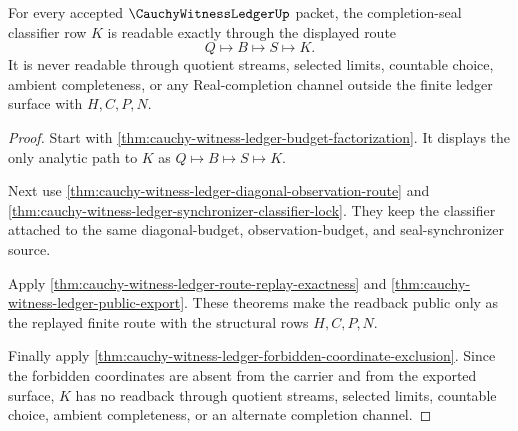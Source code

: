 \begin{theorem}
\label{thm:cauchy-witness-ledger-completion-classifier-readback}
For every accepted $\CauchyWitnessLedgerUp$ packet, the completion-seal
classifier row $K$ is readable exactly through the displayed route
$$
Q \longmapsto B \longmapsto S \longmapsto K.
$$
It is never readable through quotient streams, selected limits, countable
choice, ambient completeness, or any Real-completion channel outside the
finite ledger surface with $H,C,P,N$.
\end{theorem}
\begin{proof}
Start with \autoref{thm:cauchy-witness-ledger-budget-factorization}. It
displays the only analytic path to $K$ as
$Q \longmapsto B \longmapsto S \longmapsto K$.

Next use \autoref{thm:cauchy-witness-ledger-diagonal-observation-route} and
\autoref{thm:cauchy-witness-ledger-synchronizer-classifier-lock}. They keep
the classifier attached to the same diagonal-budget, observation-budget, and
seal-synchronizer source.

Apply \autoref{thm:cauchy-witness-ledger-route-replay-exactness} and
\autoref{thm:cauchy-witness-ledger-public-export}. These theorems make the
readback public only as the replayed finite route with the structural rows
$H,C,P,N$.

Finally apply \autoref{thm:cauchy-witness-ledger-forbidden-coordinate-exclusion}.
Since the forbidden coordinates are absent from the carrier and from the
exported surface, $K$ has no readback through quotient streams, selected
limits, countable choice, ambient completeness, or an alternate completion
channel.
\end{proof}

